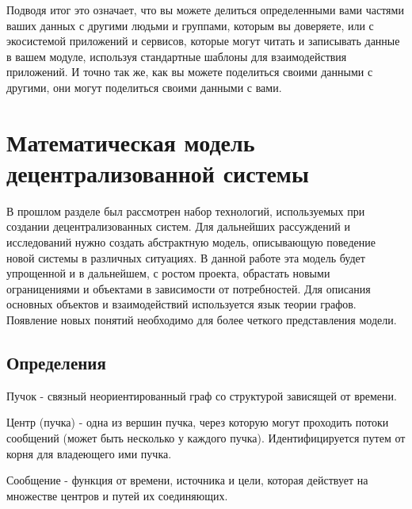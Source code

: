 Подводя итог это означает, что вы можете делиться определенными вами
частями ваших данных с другими людьми и группами, которым вы доверяете,
или с экосистемой приложений и сервисов, которые могут читать и
записывать данные в вашем модуле, используя стандартные шаблоны для
взаимодействия приложений. И точно так же, как вы можете поделиться
своими данными с другими, они могут поделиться своими данными с вами.

\hypertarget{ux43cux430ux442ux435ux43cux430ux442ux438ux447ux435ux441ux43aux430ux44f-ux43cux43eux434ux435ux43bux44c-ux434ux435ux446ux435ux43dux442ux440ux430ux43bux438ux437ux43eux432ux430ux43dux43dux43eux439-ux441ux438ux441ux442ux435ux43cux44b}{%
\section{Математическая модель децентрализованной
системы}\label{ux43cux430ux442ux435ux43cux430ux442ux438ux447ux435ux441ux43aux430ux44f-ux43cux43eux434ux435ux43bux44c-ux434ux435ux446ux435ux43dux442ux440ux430ux43bux438ux437ux43eux432ux430ux43dux43dux43eux439-ux441ux438ux441ux442ux435ux43cux44b}}

В прошлом разделе был рассмотрен набор технологий, используемых при
создании децентрализованных систем. Для дальнейших рассуждений и
исследований нужно создать абстрактную модель, описывающую поведение
новой системы в различных ситуациях. В данной работе эта модель будет
упрощенной и в дальнейшем, с ростом проекта, обрастать новыми
ограницениями и объектами в зависимости от потребностей. Для описания
основных объектов и взаимодействий используется язык теории графов.
Появление новых понятий необходимо для более четкого представления
модели.

\hypertarget{ux43eux43fux440ux435ux434ux435ux43bux435ux43dux438ux44f}{%
\subsection{Определения}\label{ux43eux43fux440ux435ux434ux435ux43bux435ux43dux438ux44f}}

Пучок - связный неориентированный граф со структурой зависящей от
времени.

Центр (пучка) - одна из вершин пучка, через которую могут проходить
потоки сообщений (может быть несколько у каждого пучка).
Идентифицируется путем от корня для владеющего ими пучка.

Сообщение - функция от времени, источника и цели, которая действует на
множестве центров и путей их соединяющих.

